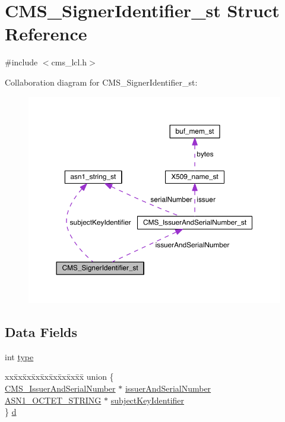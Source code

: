 \hypertarget{struct_c_m_s___signer_identifier__st}{}\section{C\+M\+S\+\_\+\+Signer\+Identifier\+\_\+st Struct Reference}
\label{struct_c_m_s___signer_identifier__st}


{\ttfamily \#include $<$cms\+\_\+lcl.\+h$>$}



Collaboration diagram for C\+M\+S\+\_\+\+Signer\+Identifier\+\_\+st\+:\nopagebreak
\begin{figure}[H]
\begin{center}
\leavevmode
\includegraphics[width=350pt]{struct_c_m_s___signer_identifier__st__coll__graph}
\end{center}
\end{figure}
\subsection*{Data Fields}
\begin{DoxyCompactItemize}
\item 
int \hyperlink{struct_c_m_s___signer_identifier__st_ac765329451135abec74c45e1897abf26}{type}
\item 
\begin{tabbing}
xx\=xx\=xx\=xx\=xx\=xx\=xx\=xx\=xx\=\kill
union \{\\
\>\hyperlink{cms__lcl_8h_a161c64a652f5a8893905640ecf4123b9}{CMS\_IssuerAndSerialNumber} $\ast$ \hyperlink{struct_c_m_s___signer_identifier__st_a19b1fce417820be55efb728bcb0877bf}{issuerAndSerialNumber}\\
\>\hyperlink{crypto_2ossl__typ_8h_afbd05e94e0f0430a2b729473efec88c1}{ASN1\_OCTET\_STRING} $\ast$ \hyperlink{struct_c_m_s___signer_identifier__st_ac3ff899746c2156f685737e09ccbb4fa}{subjectKeyIdentifier}\\
\} \hyperlink{struct_c_m_s___signer_identifier__st_a36a44b78601b1af2af47d5c6e2b1403e}{d}\\

\end{tabbing}\end{DoxyCompactItemize}


